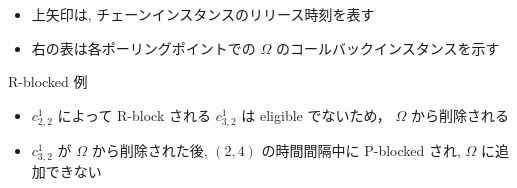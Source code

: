 \begin{frame}{}
    \begin{itemize}
        \item 上矢印は, チェーンインスタンスのリリース時刻を表す
        \item 右の表は各ポーリングポイントでの $\Omega$ のコールバックインスタンスを示す
    \end{itemize}
    \centering
\end{frame}

\begin{frame}{R-blocked 例}
\end{frame}

\begin{frame}{}
    \begin{itemize}
        \item $c_{2,2}^{1}$ によって R-block される $c_{3,2}^{1}$ は eligible でないため， $\Omega$ から削除される
        \item $c_{3,2}^{1}$ が $\Omega$ から削除された後, $(2,4)$ の時間間隔中に P-blocked され, $\Omega$ に追加できない
    \end{itemize}
\end{frame}
